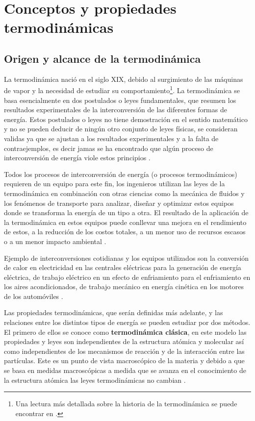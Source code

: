 \documentclass[../master.tex]{subfiles}
\begin{document}
\section{Conceptos y propiedades termodinámicas}

\subsection{Origen y alcance de la termodinámica}

La termodinámica nació en el siglo XIX, debido al surgimiento de las máquinas de vapor y la necesidad de estudiar su comportamiento\footnote{Una lectura más detallada sobre la historia de la termodinámica se puede encontrar en \cite{clavell}.}. La termodinámica se basa esencialmente en dos postulados o leyes fundamentales, que resumen los resultados experimentales de la interconversión de las diferentes formas de energía. Estos postulados o leyes no tiene demostración en el sentido matemático y no se pueden deducir de ningún otro conjunto de leyes físicas, se consideran validas ya que se ajustan a los resultados experimentales y a la falta de contraejemplos, es decir jamas se ha encontrado que algún proceso de interconversión de energía viole estos principios \parencites{glasstone}{smith-vanness}.

Todos los procesos de interconversión de energía (o procesos termodinámicos) requieren de un equipo para este fin, los ingenieros utilizan las leyes de la termodinámica en combinación con otras ciencias como la mecánica de fluidos y los fenómenos de transporte para analizar, diseñar y optimizar estos equipos donde se transforma la energía de un tipo a otra. El resultado de la aplicación de la termodinámica en estos equipos puede conllevar una mejora en el rendimiento de estos, a la reducción de los costos totales, a un menor uso de recursos escasos o a un menor impacto ambiental \parencites{wark}{moranshapiro}.

Ejemplo de interconversiones cotidianas y los equipos utilizados son la conversión de calor en electricidad en las centrales eléctricas para la generación de energía eléctrica, de trabajo eléctrico en un efecto de enfriamiento para el enfriamiento en los aires acondicionados, de trabajo mecánico en energía cinética en los motores de los automóviles \parencite{faires}.

Las propiedades termodinámicas, que serán definidas más adelante, y las relaciones entre los distintos tipos de energía se pueden estudiar por dos métodos. El primero de ellos se conoce como \textbf{termodinámica clásica}, en este modelo las propiedades y leyes son independientes de la estructura atómica y molecular así como independientes de los mecanismos de reacción y de la interacción entre las partículas. Este es un punto de vista macroscópico de la materia y debido a que se basa en medidas macroscópicas a medida que se avanza en el conocimiento de la estructura atómica las leyes termodinámicas no cambian \parencites{faires}{glasstone}{wark}.
\end{document}
